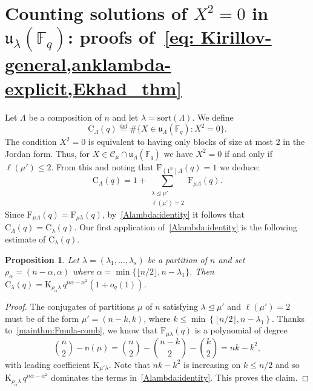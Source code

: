 \documentclass[12pt,a4paper,reqno]{amsart}
\theoremstyle{plain}
\newtheorem{proposition}[theorem]{Proposition}
\theoremstyle{definition}
\newcommand{\defin}{\overset{\mathrm{def}}{=}}
\newcommand{\less}{\unlhd}
\newcommand{\FF}{{\mathbb{F}}}
\newcommand{\1}{\mathds{1}}
\newcommand{\C}{\mathcal{C}}
\newcommand{\F}{\mathrm{F}}
\newcommand{\K}{{\mathrm{K}}}
\renewcommand{\u}{\mathfrak{u}}
\newcommand{\fn}{\mathsf{n}}
\begin{document}
\section{Counting solutions of $X^2=0$ in $\u_\lambda(\FF_q)$: proofs of~\cref{eq: Kirillov-general,anklambda-explicit,Ekhad_thm}
}
\label{matrix2=0:sec}
Let $\Lambda$ be a composition of $n$ and let $\lambda=\mathrm{sort}(\Lambda)$. We define
\begin{equation}
\mathrm{C}_{\Lambda}(q)\defin \#\{X\in \mathfrak{u}_{\Lambda}(\mathbb{F}_q): X^2=0\}.
\end{equation}
The condition $X^2=0$ is equivalent to having only blocks of size at most 2 in the Jordan form. Thus,  for $X\in \C_\mu\cap \u_\Lambda(\FF_q)$ we have $X^2=0$
if and only if
  $\ell(\mu')\leq 2$.  From this and noting that $\F_{(1^n)\Lambda}(q)=1$ we deduce:
\begin{equation}\label{Alambda:identity}
\mathrm{C}_\Lambda(q)=1+\sum_{\substack{\lambda\less \mu'\\ \ell(\mu')=2}}\F_{\mu\Lambda}(q). 
\end{equation}
Since $\F_{\mu\Lambda}(q)=\F_{\mu\lambda}(q)$, by~\cref{Alambda:identity} it follows that
$\mathrm{C}_\Lambda(q)=\mathrm{C}_\lambda(q)$.
Our first application of~\cref{Alambda:identity} is the following estimate of $\mathrm{C}_{\lambda}(q)$. 
\begin{proposition} Let $\lambda=(\lambda_1,\dots,\lambda_s)$ be a partition of $n$ and set $\rho_\alpha=(n-\alpha,\alpha)$ where $\alpha=\min\{\lfloor n/2\rfloor, n-\lambda_1\}$. 
Then $\mathrm{C}_\lambda(q)=\K_{\rho_\alpha\lambda}\, q^{n\alpha-\alpha^2}\left(1+o_q(1)\right)$. 
\end{proposition}
\begin{proof} The conjugates of partitions $\mu$ of $n$ satisfying $\lambda \less \mu'$ and $\ell(\mu') = 2$ must be of the form $\mu' = (n-k, k)$, where $k \leq \min\left\{\lfloor n/2\rfloor, n - \lambda_1\right\}$. Thanks to~\cref{mainthm:Fmula-comb}, we know that $\F_{\mu\lambda}(q)$ is a polynomial of degree 
\begin{equation}\label{binom-n(nu)}
    \binom{n}{2}-\fn(\mu)=\binom{n}{2}-\binom{n-k}{2}-\binom{k}{2}=nk-k^2,
\end{equation}
with leading coefficient $\K_{\mu'\lambda}$.  Note that $nk-k^2$ is increasing on $k\leq n/2$  and so
$
\K_{\rho_\alpha\lambda}\, q^{n\alpha-\alpha^2}
$
dominates the terms in~\cref{Alambda:identity}. This  proves the claim. 
\end{proof}
\end{document}
